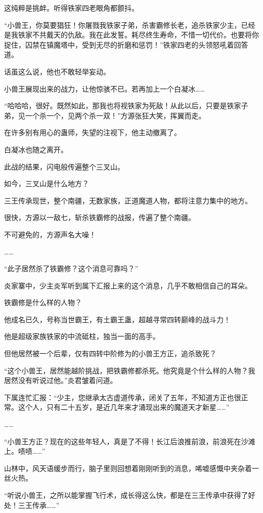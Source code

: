 \begin{this_body}
这纯粹是挑衅。听得铁家四老眼角都颤抖。

“小兽王，你莫要猖狂！你屠戮我铁家子弟，杀害霸修长老，追杀铁家少主，已经是我铁家不共戴天的仇敌。我在此发誓。耗尽终生寿命，不惜一切代价。也要将你捉住，囚禁在镇魔塔中，受到无尽的折磨和惩罚！”铁家四老的头领怒吼着回答道。

话虽这么说，他也不敢轻举妄动。

小兽王展现出来的战力，让他惊骇不已。若再加上一个白凝冰……

“哈哈哈，很好。既然如此，那我也将视铁家为死敌！从此以后，只要是铁家子弟，见一个杀一个，见两个杀一双！”方源张狂大笑，挥翼而走。

在许多别有用心的蛊师，失望的注视下，他主动撤离了。

白凝冰也随之离开。

此战的结果，闪电般传遍整个三叉山。

如今，三叉山是什么地方？

三王传承现世，整个南疆，无数家族，正道魔道人物，都将注意力集中的地方。

很快，方源以一敌七，斩杀铁霸修的战报，传遍了整个南疆。

不可避免的，方源声名大噪！

……

“此子居然杀了铁霸修？这个消息可靠吗？”

炎家寨中，少主炎军听到属下汇报上来的这个消息，几乎不敢相信自己的耳朵。

铁霸修是什么样的人物？

他成名已久，号称当世霸王，有土霸王蛊，超越寻常四转巅峰的战斗力！

他是超级家族铁家的中流砥柱，独当一面的高手。

但他居然被一个后辈，仅有四转中阶修为的小兽王方正，追杀致死？

“这个小兽王，居然能越阶挑战，把铁霸修都杀死。他究竟是个什么样的人物？我居然没有听说过他。”炎君皱着问道。

下属连忙汇报：“少主，您继承太古虚道传承，闭关了五年，不知道方正也很正常。这个人，只有二十五岁，是近几年来才涌现出来的魔道天才新星……”

……

“小兽王方正？现在的这些年轻人，真是了不得！长江后浪推前浪，前浪死在沙滩上。啧啧……”

山林中，风天语缓步而行，脑子里则回想着刚刚听到的消息，唏嘘感慨中夹杂着一丝火热。

“听说小兽王，之所以能掌握飞行术，成长得这么快，都是在三王传承中获得了好处！三王传承……”


\end{this_body}
